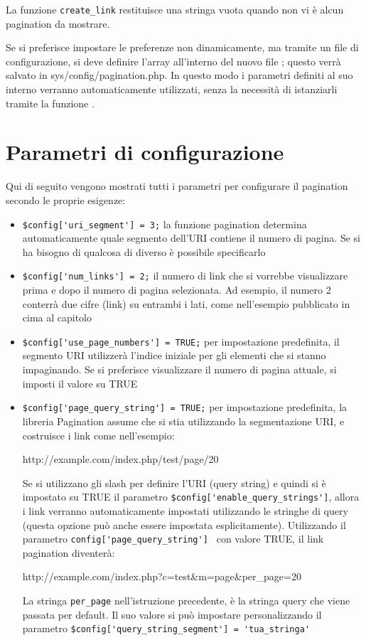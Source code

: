 La funzione \verb|create_link| restituisce una stringa vuota quando non vi è alcun pagination da mostrare.

Se si preferisce impostare le preferenze non dinamicamente, ma tramite un file di configurazione, si deve definire l'array  all'interno del nuovo file ; questo verrà salvato in sys{/config/pagination.php}. In questo modo i parametri definiti al suo interno verranno automaticamente utilizzati, senza la necessità di istanziarli tramite la funzione .

\section*{Parametri di configurazione}
Qui di seguito vengono mostrati tutti i parametri per configurare il pagination secondo le proprie esigenze:

\begin{itemize}
\item \verb|$config['uri_segment'] = 3;| la funzione pagination determina automaticamente quale segmento dell'URI contiene il numero di pagina. Se si ha bisogno di qualcosa di diverso è possibile specificarlo
\item \verb|$config['num_links'] = 2;| il numero di link che si vorrebbe visualizzare prima e dopo il numero di pagina selezionata. Ad esempio, il numero 2 conterrà due cifre (link) su entrambi i lati, come nell'esempio pubblicato in cima al capitolo
\item \verb|$config['use_page_numbers'] = TRUE;| per impostazione predefinita, il segmento URI utilizzerà l'indice iniziale per gli elementi che si stanno impaginando. Se si preferisce visualizzare il numero di pagina attuale, si imposti il valore su TRUE
\item \verb|$config['page_query_string'] = TRUE;| per impostazione predefinita, la libreria Pagination assume che si stia utilizzando la segmentazione URI, e costruisce i link come nell'esempio:

\begin{code}
http://example.com/index.php/test/page/20
\end{code}

Se si utilizzano gli slash per definire l'\ac{URI} (query string) e quindi si è impostato su TRUE il parametro \verb|$config['enable_query_strings']|, allora i link verranno automaticamente impostati utilizzando le stringhe di query (questa opzione può anche essere impostata esplicitamente). Utilizzando il parametro \verb|config['page_query_string'] | con valore TRUE, il link pagination diventerà:

\begin{code}
http://example.com/index.php?c=test&m=page&per_page=20
\end{code}

La stringa \verb|per_page| nell'istruzione precedente, è la stringa query che viene passata per default. Il suo valore si può impostare personalizzando il parametro \verb|$config['query_string_segment'] = 'tua_stringa'|
\end{itemize}

